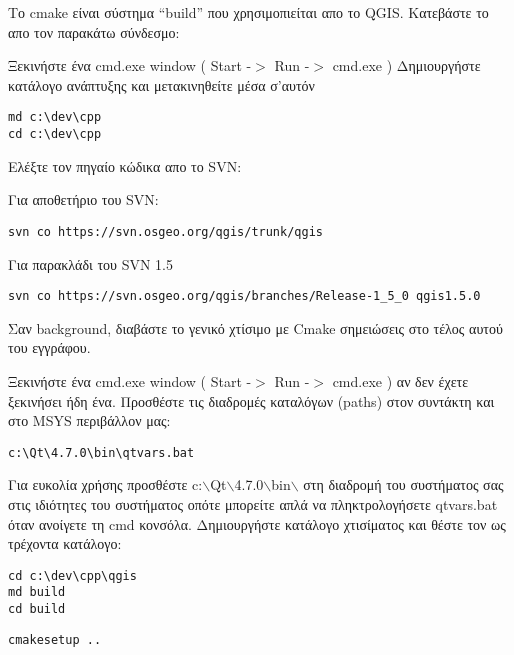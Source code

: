 Το cmake είναι σύστημα “build” που χρησιμοπιείται απο το QGIS. Κατεβάστε το απο τον παρακάτω σύνδεσμο:


Ξεκινήστε ένα cmd.exe window ( Start -$>$ Run -$>$ cmd.exe ) Δημιουργήστε κατάλογο ανάπτυξης και μετακινηθείτε μέσα σ'αυτόν

\begin{verbatim}
md c:\dev\cpp 
cd c:\dev\cpp 
\end{verbatim}

Ελέξτε τον πηγαίο κώδικα απο το SVN:

Για αποθετήριο του SVN:

\begin{verbatim}
svn co https://svn.osgeo.org/qgis/trunk/qgis 
\end{verbatim}

Για παρακλάδι του SVN 1.5

\begin{verbatim}
svn co https://svn.osgeo.org/qgis/branches/Release-1_5_0 qgis1.5.0
\end{verbatim}

Σαν background, διαβάστε το γενικό χτίσιμο με Cmake σημειώσεις στο τέλος αυτού του εγγράφου.

Ξεκινήστε ένα cmd.exe window ( Start -$>$ Run -$>$ cmd.exe ) αν δεν έχετε ξεκινήσει ήδη ένα. Προσθέστε τις διαδρομές καταλόγων (paths) στον συντάκτη και στο MSYS περιβάλλον μας: 

\begin{verbatim}
c:\Qt\4.7.0\bin\qtvars.bat 
\end{verbatim}

Για ευκολία χρήσης προσθέστε c:$\backslash$Qt$\backslash$4.7.0$\backslash$bin$\backslash$ στη διαδρομή του συστήματος σας στις ιδιότητες του συστήματος οπότε μπορείτε απλά να πληκτρολογήσετε qtvars.bat όταν ανοίγετε τη cmd κονσόλα. Δημιουργήστε κατάλογο χτισίματος και θέστε τον ως τρέχοντα κατάλογο:

\begin{verbatim}
cd c:\dev\cpp\qgis 
md build 
cd build 
\end{verbatim}

\begin{verbatim}
cmakesetup ..  
\end{verbatim}

